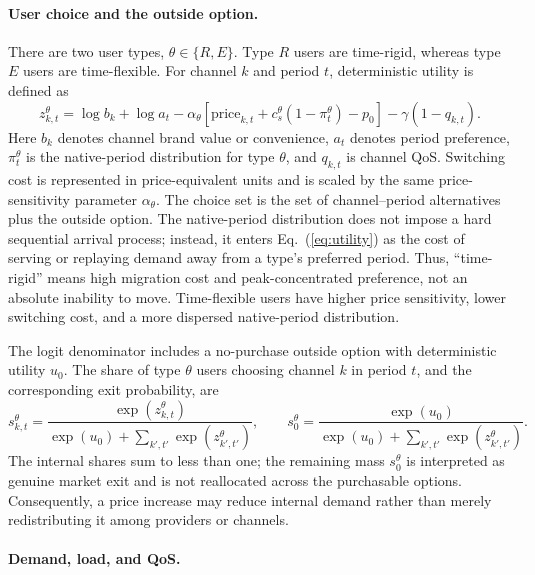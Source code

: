 \documentclass[11pt,a4paper]{article}
\begin{document}
\paragraph{User choice and the outside option.}

There are two user types, $\theta\in\{R,E\}$. Type $R$ users are time-rigid, whereas type $E$ users are time-flexible. For channel $k$ and period $t$, deterministic utility is defined as
\begin{equation}
  z^\theta_{k,t}=\log b_k+\log a_t
  -\alpha_\theta\!\left[\text{price}_{k,t}+c_s^\theta(1-\pi^\theta_t)-p_0\right]
  -\gamma(1-q_{k,t}).
  \label{eq:utility}
\end{equation}
Here $b_k$ denotes channel brand value or convenience, $a_t$ denotes period preference, $\pi^\theta_t$ is the native-period distribution for type $\theta$, and $q_{k,t}$ is channel QoS. Switching cost is represented in price-equivalent units and is scaled by the same price-sensitivity parameter $\alpha_\theta$. The choice set is the set of channel--period alternatives plus the outside option. The native-period distribution does not impose a hard sequential arrival process; instead, it enters Eq.~(\ref{eq:utility}) as the cost of serving or replaying demand away from a type's preferred period. Thus, ``time-rigid'' means high migration cost and peak-concentrated preference, not an absolute inability to move. Time-flexible users have higher price sensitivity, lower switching cost, and a more dispersed native-period distribution.

The logit denominator includes a no-purchase outside option with deterministic utility $u_0$. The share of type $\theta$ users choosing channel $k$ in period $t$, and the corresponding exit probability, are
\begin{equation}
  s^\theta_{k,t}=\frac{\exp(z^\theta_{k,t})}{\exp(u_0)+\sum_{k',t'}\exp(z^\theta_{k',t'})},
  \qquad
  s^\theta_0=\frac{\exp(u_0)}{\exp(u_0)+\sum_{k',t'}\exp(z^\theta_{k',t'})}.
  \label{eq:share}
\end{equation}
The internal shares sum to less than one; the remaining mass $s^\theta_0$ is interpreted as genuine market exit and is not reallocated across the purchasable options. Consequently, a price increase may reduce internal demand rather than merely redistributing it among providers or channels.

\paragraph{Demand, load, and QoS.}
\end{document}
